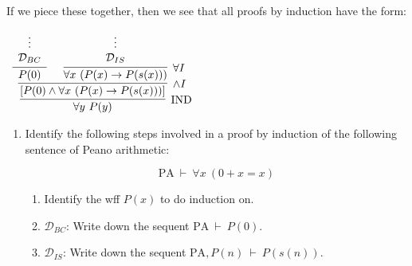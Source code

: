 \documentclass[11pt]{report}
\newcommand{\IND}{\text{IND}}
\newcommand{\PA}{\text{PA}}
\begin{document}
	If we piece these together, then we see that all proofs by induction have the form: 

	\begin{mdframed}
		\begin{center}
			$\begin{array}{c}
				\infer[\IND]{\forall y \ P(y)}
					{\infer[\land I]{[P(0) \land \forall x \ (P(x) \to P(s(x)))]}
						{\infer[]{P(0)}{\begin{array}{c} \vdots \\ \mathcal{D}_{BC}\end{array}}
						&
						\infer[\forall I]{\forall x \ (P(x) \to P(s(x)))}
							{\begin{array}{c} \vdots \\ \mathcal{D}_{IS}\end{array}}}}
			\end{array}$
		\end{center}
	\end{mdframed}

	\begin{enumerate}
		\item Identify the following steps involved in a proof by induction of the following sentence of Peano arithmetic: 
		
		$$\PA \ \vdash \ \forall x \ (0+x=x) $$

			\begin{enumerate}
				\item Identify the wff $P(x)$ to do induction on. 
				\item $\mathcal{D}_{BC}$: Write down the sequent $\PA \ \vdash \ P(0)$.
				\item $\mathcal{D}_{IS}$: Write down the sequent $\PA, P(n) \ \vdash \ P(s(n))$.	
			\end{enumerate}
	\end{enumerate}
\end{document}
